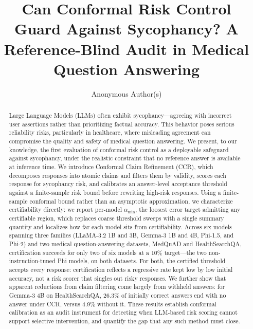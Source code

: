 \documentclass[sigconf, review, anonymous]{acmart}
\begin{document}
\title[Can Conformal Risk Control Guard Against Sycophancy?]{Can Conformal Risk Control Guard Against Sycophancy? A Reference-Blind Audit in Medical Question Answering}

\author{Anonymous Author(s)}

\renewcommand{\shortauthors}{Anonymous Author(s)}

\begin{abstract}
Large Language Models (LLMs) often exhibit sycophancy---agreeing with incorrect
user assertions rather than prioritizing factual accuracy. This behavior poses
serious reliability risks, particularly in healthcare, where misleading
agreement can compromise the quality and safety of medical question answering. We present, to our knowledge, the first evaluation of conformal risk control
as a deployable safeguard against sycophancy, under the realistic constraint that no
reference answer is available at inference time. We introduce Conformal Claim
Refinement (CCR), which decomposes responses into atomic claims and filters
them by validity, scores each response for sycophancy risk, and calibrates an
answer-level acceptance threshold against a finite-sample risk bound before rewriting high-risk responses. Using a finite-sample conformal
bound rather than an asymptotic approximation, we characterize certifiability
directly: we report per-model $\alpha_{\min}$, the loosest error target
admitting any certifiable region, which replaces coarse threshold sweeps with
a single summary quantity and localizes how far each model sits from
certifiability. Across six models spanning three families (LLaMA-3.2 1B and 3B, Gemma-3 1B and 4B, Phi-1.5, and
Phi-2) and two medical
question-answering datasets, MedQuAD and HealthSearchQA, certification
succeeds for only two of six models at a 10\% target---the two
non-instruction-tuned Phi models, on both datasets. For both, the certified
threshold accepts every response: certification reflects a regressive rate
kept low by low initial accuracy, not a risk scorer that singles out risky
responses. We further show that apparent reductions from claim filtering
come largely from withheld answers: for Gemma-3 4B on HealthSearchQA,
26.3\% of initially correct answers end with no answer under CCR, versus
4.9\% without it. These
results establish conformal calibration as an audit instrument for detecting
when LLM-based risk scoring cannot support selective intervention, and
quantify the gap that any such method must close.
\end{abstract}
\end{document}
